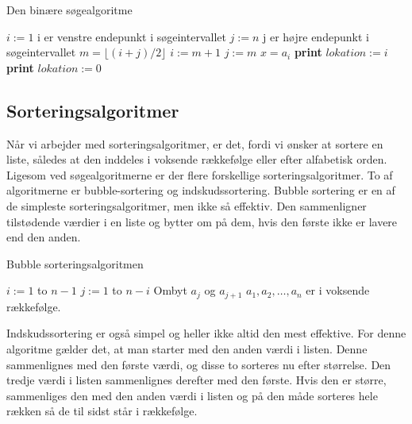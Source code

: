 \begin{algorithm}
\caption{Den binære søgealgoritme}
\begin{algorithmic}[1]

    \State $i:=1$ {i er venstre endepunkt i søgeintervallet}
    \State $j:=n$ {j er højre endepunkt i søgeintervallet}
        \State $m=\lfloor (i+j)/2 \rfloor$
    		\State $i:=m+1$
    		\Else
    		\State $j:=m$
    		\EndIf
    \If $x=a_{i}$
    \State \textbf{print} $lokation:=i$
    \Else
    \State \textbf{print} $lokation:=0$
    \EndIf
    \EndWhile  \label{roy's loop}
\EndProcedure

\end{algorithmic}
\end{algorithm}

\subsection{Sorteringsalgoritmer}
Når vi arbejder med sorteringsalgoritmer, er det, fordi vi ønsker at sortere en liste, således at den inddeles i voksende rækkefølge eller efter alfabetisk orden. Ligesom ved søgealgoritmerne er der flere forskellige sorteringsalgoritmer. To af algoritmerne er bubble-sortering og indskudssortering. Bubble sortering er en af de simpleste sorteringsalgoritmer, men ikke så effektiv. Den sammenligner tilstødende værdier i en liste og bytter om på dem, hvis den første ikke er lavere end den anden.

\begin{algorithm}
\caption{Bubble sorteringsalgoritmen}
\begin{algorithmic}[1]

\EndProcedure
\For $i:=1$ to $n-1$
    	\For $j:=1$ to $n-i$
    			\State Ombyt $a_{j}$ og $a_{j+1}$ 	
\EndIf
\EndFor
\EndFor
\State $a_{1},a_{2},\dotsc,a_{n}$ er i voksende rækkefølge. 

\end{algorithmic}
\end{algorithm}

Indskudssortering er også simpel og heller ikke altid den mest effektive. For denne algoritme gælder det, at man starter med den anden værdi i listen. Denne sammenlignes med den første værdi, og disse to sorteres nu efter størrelse. Den tredje værdi i listen sammenlignes derefter med den første. Hvis den er større, sammenliges den med den anden værdi i listen og på den måde sorteres hele rækken så de til sidst står i rækkefølge.

